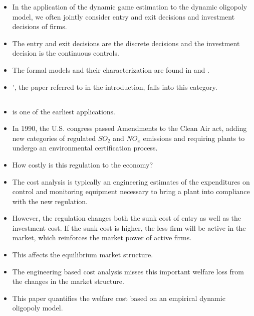 \documentclass[]{book}
\providecommand{\tightlist}{%
  \setlength{\itemsep}{0pt}\setlength{\parskip}{0pt}}
\begin{document}
\begin{itemize}
\tightlist
\item
  In the application of the dynamic game estimation to the dynamic
  oligopoly model, we often jointly consider entry and exit decisions
  and investment decisions of firms.
\item
  The entry and exit decisions are the discrete decisions and the
  investment decision is the continuous controls.
\item
  The formal models and their characterization are found in
  \citet{ericsonMarkovPerfectIndustryDynamics1995} and
  \citet{doraszelskiComputableMarkovperfectIndustry2010}.
\item
  \citet{Igami2018}', the paper referred to in the introduction, falls
  into this category.
\end{itemize}

\subsection{\texorpdfstring{\citet{ryanCostEnvironmentRegulation2012}}{@ryanCostEnvironmentRegulation2012}}\label{ryancostenvironmentregulation2012}

\begin{itemize}
\tightlist
\item
  \citet{ryanCostEnvironmentRegulation2012} is one of the earliest
  applications.
\item
  In 1990, the U.S. congress passed Amendments to the Clean Air act,
  adding new categories of regulated \(SO_2\) and \(NO_x\) emissions and
  requiring plants to undergo an environmental certification process.
\item
  How costly is this regulation to the economy?
\item
  The cost analysis is typically an engineering estimates of the
  expenditures on control and monitoring equipment necessary to bring a
  plant into compliance with the new regulation.
\item
  However, the regulation changes both the sunk cost of entry as well as
  the investment cost. If the sunk cost is higher, the less firm will be
  active in the market, which reinforces the market power of active
  firms.
\item
  This affects the equilibrium market structure.
\item
  The engineering based cost analysis misses this important welfare loss
  from the changes in the market structure.
\item
  This paper quantifies the welfare cost based on an empirical dynamic
  oligopoly model.
\end{itemize}
\end{document}
